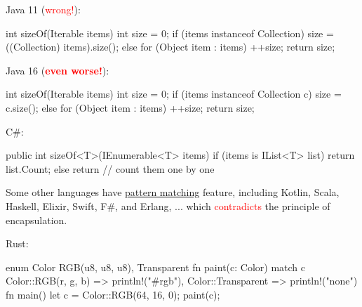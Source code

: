 \documentclass{article}
\begin{document}
\begin{pptWide}{2}
Java 11 (\textcolor{red}{wrong!}):
\par
{\small\begin{ffcode}
int sizeOf(Iterable items) {
  int size = 0;
  if (items instanceof Collection) {
    size = ((Collection) items).size();
  } else {
    for (Object item : items) {
      ++size;
    }
  }
  return size;
}
\end{ffcode}
}
\par\columnbreak\par
Java 16 (\textcolor{red}{\textbf{even worse!}}):
\par
{\small\begin{ffcode}
int sizeOf(Iterable items) {
  int size = 0;
  if (items instanceof Collection c) {
    size = c.size();
  } else {
    for (Object item : items) {
      ++size;
    }
  }
  return size;
}
\end{ffcode}
}
\end{pptWide}
\par
\plush{}

\begin{pptWide}{2}
C\#:\par
{\scriptsize\begin{ffcode}
public int sizeOf<T>(IEnumerable<T> items) {
  if (items is IList<T> list) {
    return list.Count;
  } else {
    return // count them one by one
  }
}
\end{ffcode}
}
\par
Some other languages have \ul{pattern matching} feature,
including Kotlin, Scala, Haskell, Elixir, Swift, F\#, and Erlang, ...
which \textcolor{red}{contradicts} the principle of encapsulation.
\par\columnbreak\par
Rust:
\par
{\scriptsize\begin{ffcode}
enum Color {
  RGB(u8, u8, u8),
  Transparent
}
fn paint(c: Color) {
  match c {
    Color::RGB(r, g, b) =>
      println!("#{r}{g}{b}"),
    Color::Transparent =>
      println!("none")
  }
}
fn main() {
  let c = Color::RGB(64, 16, 0);
  paint(c);
}
\end{ffcode}
}
\end{pptWide}
\par
\plush{}

\end{document}
